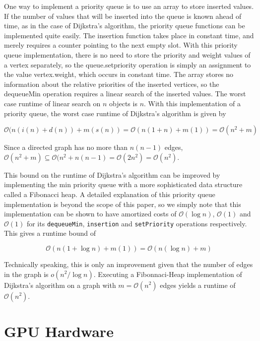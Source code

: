 \documentclass[12pt,twoside]{reedthesis}
\newcommand{\var}[1]{{\mbox{\tt#1}}}
\begin{document}
\vspace{1pc}

One way to implement a priority queue is to use an array to store inserted values. If the number of values that will be inserted into the queue is known ahead of time, as in the case of Dijkstra's algorithm, the priority queue functions can be implemented quite easily. The insertion function takes place in constant time, and merely requires a counter pointing to the next empty slot. With this priority queue implementation, there is no need to store the priority and weight values of a vertex separately, so the queue.setpriority operation is simply an assignment to the value vertex.weight, which occurs in constant time. The array stores no information about the relative priorities of the inserted vertices, so the dequeueMin operation requires a linear search of the inserted values. The worst case runtime of linear search on $n$ objects is $n$. With this implementation of a priority queue, the worst case runtime of Dijkstra's algorithm is given by

$$
\mathcal{O}(n(i(n) + d(n)) + m(s(n)) = \mathcal{O}(n(1+n) + m(1)) = \mathcal{O}(n^2 + m)
$$

Since a directed graph has no more than $n(n-1)$ edges, $\mathcal{O}(n^2 + m) \subseteq \mathcal{O}(n^2 + n(n-1) = \mathcal{O}(2n^2) = \mathcal{O}(n^2)$.

\vspace{1pc}

This bound on the runtime of Dijkstra's algorithm can be improved by implementing the min priority queue with a more sophisticated data structure called a Fibonacci heap. A detailed explanation of this priority queue implementation is beyond the scope of this paper, so we simply note that this implementation can be shown to have amortized costs of $\mathcal{O}(\log n)$, $\mathcal{O}(1)$ and $\mathcal{O}(1)$ for its \var{dequeueMin}, \var{insertion} and \var{setPriority} operations respectively. This gives a runtime bound of 

$$
\mathcal{O}(n(1+ \log n) + m(1)) = \mathcal{O}(n(\log n) + m)
$$

Technically speaking, this is only an improvement given that the number of edges in the graph is $o(n^2/\log n)$. Executing a Fibonnaci-Heap implementation of Dijkstra's algorithm on a graph with $m = \mathcal{O}(n^2)$ edges yields a runtime of $\mathcal{O}(n^2)$.

\chapter{GPU Hardware}
\end{document}
